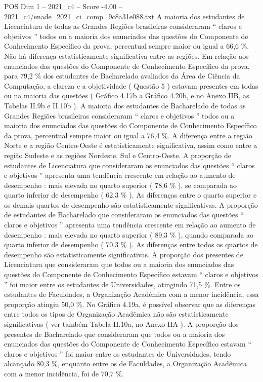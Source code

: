 \begin{textsample}{POS Dim 1 – 2021\_c4 – Score -4.00 – 2021\_c4/enade\_2021\_ci\_comp\_9c8a31e088.txt}
A maioria dos estudantes de Licenciatura de todas as Grandes Regiões brasileiras consideraram “ claros e objetivos ” todos ou a maioria dos enunciados das questões do Componente de Conhecimento Específico da prova, percentual sempre maior ou igual a 66,6 \%.
Não há diferença estatisticamente significativa entre as regiões.
Em relação aos enunciados das questões do Componente de Conhecimento Específico da prova, para 79,2 \% dos estudantes de Bacharelado avaliados da Área de Ciência da Computação, a clareza e a objetividade ( Questão 5 ) estavam presentes em todas ou na maioria das questões ( Gráfico 4.17b a Gráfico 4.20b, e no Anexo IIB, as Tabelas II.9b e II.10b ).
A maioria dos estudantes de Bacharelado de todas as Grandes Regiões brasileiras consideraram “ claros e objetivos ” todos ou a maioria dos enunciados das questões do Componente de Conhecimento Específico da prova, percentual sempre maior ou igual a 76,4 \%.
A diferença entre a região Norte e a região Centro-Oeste é estatisticamente significativa, assim como entre a região Sudeste e as regiões Nordeste, Sul e Centro-Oeste.
A proporção de estudantes de Licenciatura que consideraram os enunciados das questões “ claros e objetivos ” apresenta uma tendência crescente em relação ao aumento de desempenho : mais elevada no quarto superior ( 78,6 \% ), se comparada ao quarto inferior de desempenho ( 62,3 \% ).
As diferenças entre o quarto superior e os demais quartos de desempenho são estatisticamente significativas.
A proporção de estudantes de Bacharelado que consideraram os enunciados das questões “ claros e objetivos ” apresenta uma tendência crescente em relação ao aumento de desempenho : mais elevada no quarto superior ( 89,3 \% ), quando comparada ao quarto inferior de desempenho ( 70,3 \% ).
As diferenças entre todos os quartos de desempenho são estatisticamente significativas.
A proporção dos presentes de Licenciatura que consideraram que todos ou a maioria dos enunciados das questões do Componente de Conhecimento Específico estavam “ claros e objetivos ” foi maior entre os estudantes de Universidades, atingindo 71,5 \%.
Entre os estudantes de Faculdades, a Organização Acadêmica com a menor incidência, essa proporção atingiu 50,0 \%.
No Gráfico 4.19a, é possível observar que as diferenças entre todos os tipos de Organização Acadêmica não são estatisticamente significativas ( ver também Tabela II.10a, no Anexo IIA ).
A proporção dos presentes de Bacharelado que consideraram que todos ou a maioria dos enunciados das questões do Componente de Conhecimento Específico estavam “ claros e objetivos ” foi maior entre os estudantes de Universidades, tendo alcançado 80,3 \%, enquanto entre os de Faculdades, a Organização Acadêmica com a menor incidência, foi de 70,7 \%.

\end{textsample}
